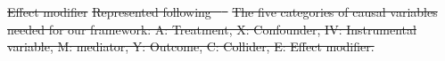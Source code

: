 \documentclass[10pt,letterpaper]{article}
\providecommand{\DIFdeltex}[1]{{\protect\color{red}\sout{#1}}}                      %
\providecommand{\DIFdelFL}[1]{\DIFdel{#1}} %
\providecommand{\DIFdel}[1]{\texorpdfstring{\DIFdeltex{#1}}{}} %
\begin{document}
\DIFdelFL{Effect modifier }%
\DIFdelFL{Represented
  following \mbox{%
    \cite{attia2022proposal}
  }\hskip0pt%
}%
{%
  \DIFdelFL{The five categories of causal variables needed for our framework: A:
    Treatment, X: Confounder, IV: Instrumental variable, M: mediator, Y:
    Outcome, C: Collider, E: Effect modifier.}}%



\end{document}
